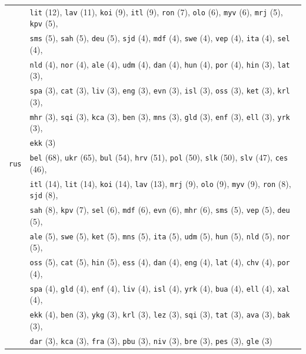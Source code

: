 \begin{center}
\begin{longtable}{ll}
 & \texttt{lit} (12), \texttt{lav} (11), \texttt{koi} (9), \texttt{itl} (9), \texttt{ron} (7), \texttt{olo} (6), \texttt{myv} (6), \texttt{mrj} (5), \texttt{kpv} (5),\\
 & \texttt{sms} (5), \texttt{sah} (5), \texttt{deu} (5), \texttt{sjd} (4), \texttt{mdf} (4), \texttt{swe} (4), \texttt{vep} (4), \texttt{ita} (4), \texttt{sel} (4),\\
 & \texttt{nld} (4), \texttt{nor} (4), \texttt{ale} (4), \texttt{udm} (4), \texttt{dan} (4), \texttt{hun} (4), \texttt{por} (4), \texttt{hin} (3), \texttt{lat} (3),\\
 & \texttt{spa} (3), \texttt{cat} (3), \texttt{liv} (3), \texttt{eng} (3), \texttt{evn} (3), \texttt{isl} (3), \texttt{oss} (3), \texttt{ket} (3), \texttt{krl} (3),\\
 & \texttt{mhr} (3), \texttt{sqi} (3), \texttt{kca} (3), \texttt{ben} (3), \texttt{mns} (3), \texttt{gld} (3), \texttt{enf} (3), \texttt{ell} (3), \texttt{yrk} (3),\\
 & \texttt{ekk} (3) \\
\texttt{rus} & \texttt{bel} (68), \texttt{ukr} (65), \texttt{bul} (54), \texttt{hrv} (51), \texttt{pol} (50), \texttt{slk} (50), \texttt{slv} (47), \texttt{ces} (46),\\
 & \texttt{itl} (14), \texttt{lit} (14), \texttt{koi} (14), \texttt{lav} (13), \texttt{mrj} (9), \texttt{olo} (9), \texttt{myv} (9), \texttt{ron} (8), \texttt{sjd} (8),\\
 & \texttt{sah} (8), \texttt{kpv} (7), \texttt{sel} (6), \texttt{mdf} (6), \texttt{evn} (6), \texttt{mhr} (6), \texttt{sms} (5), \texttt{vep} (5), \texttt{deu} (5),\\
 & \texttt{ale} (5), \texttt{swe} (5), \texttt{ket} (5), \texttt{mns} (5), \texttt{ita} (5), \texttt{udm} (5), \texttt{hun} (5), \texttt{nld} (5), \texttt{nor} (5),\\
 & \texttt{oss} (5), \texttt{cat} (5), \texttt{hin} (5), \texttt{ess} (4), \texttt{dan} (4), \texttt{eng} (4), \texttt{lat} (4), \texttt{chv} (4), \texttt{por} (4),\\
 & \texttt{spa} (4), \texttt{gld} (4), \texttt{enf} (4), \texttt{liv} (4), \texttt{isl} (4), \texttt{yrk} (4), \texttt{bua} (4), \texttt{ell} (4), \texttt{xal} (4),\\
 & \texttt{ekk} (4), \texttt{ben} (3), \texttt{ykg} (3), \texttt{krl} (3), \texttt{lez} (3), \texttt{sqi} (3), \texttt{tat} (3), \texttt{ava} (3), \texttt{bak} (3),\\
 & \texttt{dar} (3), \texttt{kca} (3), \texttt{fra} (3), \texttt{pbu} (3), \texttt{niv} (3), \texttt{bre} (3), \texttt{pes} (3), \texttt{gle} (3) \\

\end{longtable}
\end{center}
